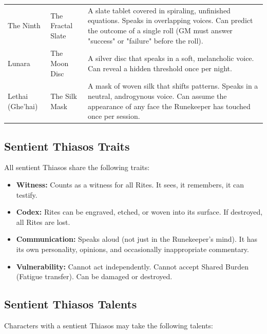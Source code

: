 \begin{table}[h]
\begin{tabular}{lll}
\hline
The Ninth & The Fractal Slate & A slate tablet covered in spiraling, unfinished equations. Speaks in overlapping voices. Can predict the outcome of a single roll (GM must answer "success" or "failure" before the roll). \\
Lunara & The Moon Disc & A silver disc that speaks in a soft, melancholic voice. Can reveal a hidden threshold once per night. \\
\hline
Lethai (Ghe'hai) & The Silk Mask & A mask of woven silk that shifts patterns. Speaks in a neutral, androgynous voice. Can assume the appearance of any face the Runekeeper has touched once per session. \\
\hline
\end{tabular}
\end{table}

\subsection*{Sentient Thiasos Traits}

All sentient Thiasos share the following traits:

\begin{itemize}
\item \textbf{Witness:} Counts as a witness for all Rites. It sees, it remembers, it can testify.
\item \textbf{Codex:} Rites can be engraved, etched, or woven into its surface. If destroyed, all Rites are lost.
\item \textbf{Communication:} Speaks aloud (not just in the Runekeeper's mind). It has its own personality, opinions, and occasionally inappropriate commentary.
\item \textbf{Vulnerability:} Cannot act independently. Cannot accept Shared Burden (Fatigue transfer). Can be damaged or destroyed.
\end{itemize}

\subsection*{Sentient Thiasos Talents}

Characters with a sentient Thiasos may take the following talents:

